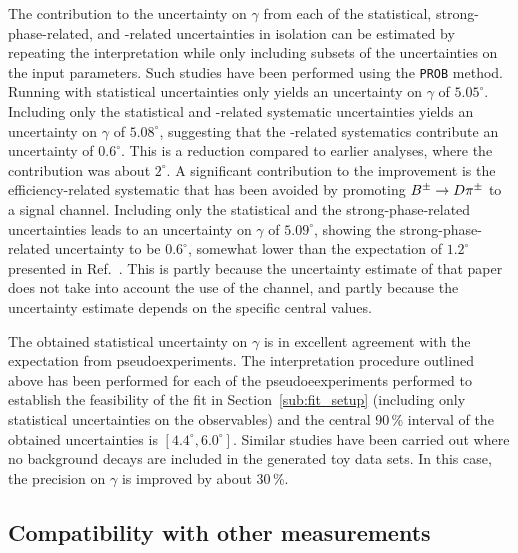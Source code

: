 The contribution to the uncertainty on $\gamma$ from each of the statistical, strong-phase-related, and \lhcb-related uncertainties in isolation can be estimated by repeating the interpretation while only including subsets of the uncertainties on the input parameters. Such studies have been performed using the \texttt{PROB} method. Running with statistical uncertainties only yields an uncertainty on $\gamma$ of $5.05^\circ$. Including only the statistical and \lhcb-related systematic uncertainties yields an uncertainty on $\gamma$ of $5.08^\circ$, suggesting that the \lhcb-related systematics  contribute an uncertainty of $0.6^\circ$. This is a reduction compared to earlier analyses, where the contribution was about $2^\circ$. A significant contribution to the improvement is the efficiency-related systematic that has been avoided by promoting ${{{B}^\pm}\rightarrow{\ensuremath{D}}{\ensuremath{{\pi}^\pm}}}$ to a signal channel. Including only the statistical and the strong-phase-related uncertainties leads to an uncertainty on $\gamma$ of $5.09^\circ$, showing the strong-phase-related uncertainty to be $0.6^\circ$, somewhat lower than the expectation of $1.2^\circ$  presented in Ref.~\cite{BESCISI}. This is partly because the uncertainty estimate of that paper does not take into account the use of the \DtoKsKK channel, and partly because the uncertainty estimate depends on the specific central values.

The obtained statistical uncertainty on $\gamma$ is in excellent agreement with the expectation from pseudoexperiments. The interpretation procedure outlined above has been performed for each of the pseudoeexperiments performed to establish the feasibility of the \CP fit in Section~\ref{sub:fit_setup} (including only statistical uncertainties on the observables) and the central 90\,\% interval of the obtained uncertainties is $[4.4^\circ, 6.0^\circ]$. Similar studies have been carried out where no background decays are included in the generated toy data sets. In this case, the precision on $\gamma$ is improved by about 30\,\%.

\subsection{Compatibility with other measurements} %
\label{sub:compatibility_with_other_measurements}

